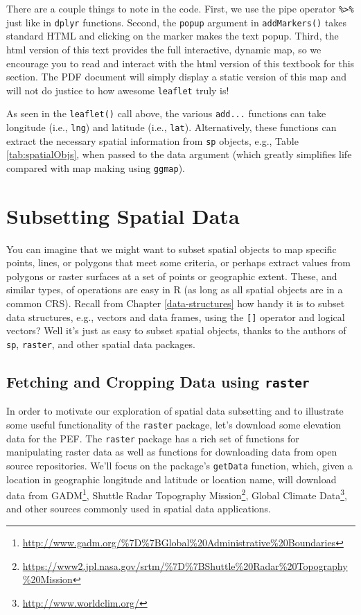 \documentclass[]{krantz}
\renewcommand{\href}[2]{#2\footnote{\url{#1}}}
\theoremstyle{definition}
\theoremstyle{definition}
\theoremstyle{definition}
\theoremstyle{remark}
\begin{document}
\hypertarget{htmlwidget-457d518f433363e38ed7}{}

There are a couple things to note in the code. First, we use the pipe
operator \texttt{\%\textgreater{}\%} just like in \texttt{dplyr}
functions. Second, the \texttt{popup} argument in \texttt{addMarkers()}
takes standard HTML and clicking on the marker makes the text popup.
Third, the html version of this text provides the full interactive,
dynamic map, so we encourage you to read and interact with the html
version of this textbook for this section. The PDF document will simply
display a static version of this map and will not do justice to how
awesome \texttt{leaflet} truly is!

As seen in the \texttt{leaflet()} call above, the various
\texttt{add...} functions can take longitude (i.e., \texttt{lng}) and
latitude (i.e., \texttt{lat}). Alternatively, these functions can
extract the necessary spatial information from \texttt{sp} objects,
e.g., Table \ref{tab:spatialObjs}, when passed to the data argument
(which greatly simplifies life compared with map making using
\texttt{ggmap}).

\section{Subsetting Spatial Data}\label{subsetting-spatial-data}

You can imagine that we might want to subset spatial objects to map
specific points, lines, or polygons that meet some criteria, or perhaps
extract values from polygons or raster surfaces at a set of points or
geographic extent. These, and similar types, of operations are easy in R
(as long as all spatial objects are in a common CRS). Recall from
Chapter \ref{data-structures} how handy it is to subset data structures,
e.g., vectors and data frames, using the \texttt{{[}{]}} operator and
logical vectors? Well it's just as easy to subset spatial objects,
thanks to the authors of \texttt{sp}, \texttt{raster}, and other spatial
data packages.

\subsection{\texorpdfstring{Fetching and Cropping Data using
\texttt{raster}}{Fetching and Cropping Data using raster}}\label{fetching-and-cropping-data-using-raster}

In order to motivate our exploration of spatial data subsetting and to
illustrate some useful functionality of the \texttt{raster} package,
let's download some elevation data for the PEF. The \texttt{raster}
package has a rich set of functions for manipulating raster data as well
as functions for downloading data from open source repositories. We'll
focus on the package's \texttt{getData} function, which, given a
location in geographic longitude and latitude or location name, will
download data from
\href{http://www.gadm.org/\%7D\%7BGlobal\%20Administrative\%20Boundaries}{GADM},
\href{https://www2.jpl.nasa.gov/srtm/\%7D\%7BShuttle\%20Radar\%20Topography\%20Mission}{Shuttle
Radar Topography Mission}, \href{http://www.worldclim.org/}{Global
Climate Data}, and other sources commonly used in spatial data
applications.
\end{document}
